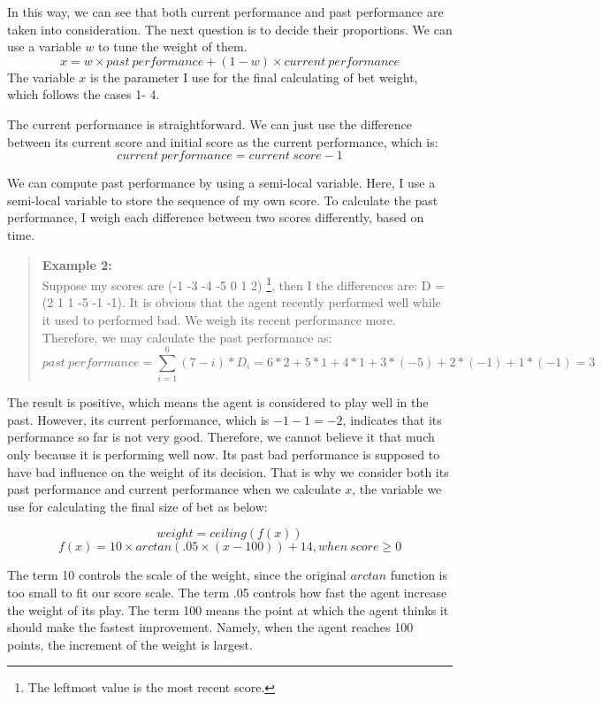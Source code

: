 \documentclass[10pt]{article}
\begin{document}
In this way, we can see that both current performance and past performance are taken into consideration. The next question is to decide their proportions. We can use a variable $w$ to tune the weight of them.
$$
x = w\times past\ performance + (1-w)\times current\ performance
$$
The variable $x$ is the parameter I use for the final calculating of bet weight, which follows the cases 1- 4.

The current performance is straightforward. We can just use the difference between its current score and initial score as the current performance, which is:
$$
current\ performance = current\ score - 1
$$

We can compute past performance by using a semi-local variable. Here, I use a semi-local variable to store the sequence of my own score. To calculate the past performance, I weigh each difference between two scores differently, based on time.

\begin{quote}
\textbf{Example 2:}\\
Suppose my scores are (-1 -3 -4 -5 0 1 2) \footnote{The leftmost value is the most recent score.}, then I the differences are: D = (2 1 1 -5 -1 -1). It is obvious that the agent recently performed well while it used to performed bad. We weigh its recent performance more. Therefore, we may calculate the past performance as:
$$
past\ performance = \sum_{i=1}^{6}(7-i)*D_i = 6*2 +5*1 + 4*1 + 3*(-5) + 2*(-1) + 1*(-1) = 3
$$
\end{quote}
The result is positive, which means the agent is considered to play well in the past. However, its current performance, which is $-1 - 1 = -2$, indicates that its performance so far is not very good. Therefore, we cannot believe it that much only because it is performing well now. Its past bad performance is supposed to have bad influence on the weight of its decision. That is why we consider both its past performance and current performance when we calculate $x$, the variable we use for calculating the final size of bet as below:

$$
weight=ceiling(f(x))
$$
$$
f(x)=10\times arctan(.05\times (x - 100)) + 14, when\ score\geq 0
$$

The term 10 controls the scale of the weight, since the original $arctan$ function is too small to fit our score scale. The term .05 controls how fast the agent increase the weight of its play. The term 100 means the point at which the agent thinks it should make the fastest improvement. Namely, when the agent reaches 100 points, the increment of the weight is largest.
\end{document}

